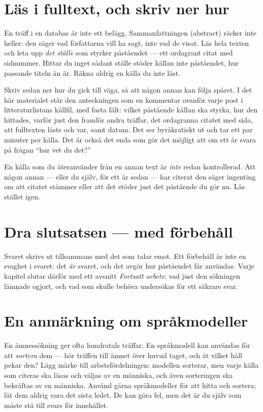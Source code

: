 \section{Läs i fulltext, och skriv ner hur}

En träff i en databas är inte ett belägg.  Sammanfattningen
(\foreignlanguage{english}{abstract}) räcker inte heller: den säger vad
författarna vill ha sagt, inte vad de visat.  Läs hela texten och leta
upp \emph{det ställe} som styrker påståendet --- ett ordagrant citat med
sidnummer.  Hittar du inget sådant ställe stöder källan inte påståendet,
hur passande titeln än är.  Räkna aldrig en källa du inte läst.

Skriv sedan ner hur du gick till väga, så att någon annan kan följa
spåret.  I det här materialet står den anteckningen som en kommentar
ovanför varje post i litteraturlistans källfil, med fasta fält: vilket
påstående källan ska styrka, hur den hittades, varför just den framför
andra träffar, det ordagranna citatet med sida, att fulltexten lästs och
var, samt datum.  Det ser byråkratiskt ut och tar ett par minuter per
källa.  Det är också det enda som gör det möjligt att om ett år svara på
frågan \enquote{hur vet du det?}

En källa som du återanvänder från en annan text är \emph{inte} redan
kontrollerad.  Att någon annan --- eller du själv, för ett år sedan ---
har citerat den säger ingenting om att citatet stämmer eller att det
stöder just det påstående du gör nu.  Läs stället igen.

\section{Dra slutsatsen --- med förbehåll}

Svaret skrivs ut tillsammans med det som talar emot.  Ett förbehåll är
inte en svaghet i svaret: det \emph{är} svaret, och det avgör hur
påståendet får användas.  Varje kapitel slutar därför med ett avsnitt
\emph{Fortsatt arbete}: vad just den sökningen lämnade ogjort, och vad
som skulle behöva undersökas för ett säkrare svar.

\section{En anmärkning om språkmodeller}

En ämnessökning ger ofta hundratals träffar.  En språkmodell kan
användas för att \emph{sortera} dem --- hör träffen till ämnet över
huvud taget, och åt vilket håll pekar den?  Lägg märke till
arbetsfördelningen: modellen sorterar, men varje källa som citeras ska
läsas och väljas av en människa, och även sorteringen ska bekräftas av
en människa.  Använd gärna språkmodeller för att hitta och sortera; låt
dem aldrig vara det sista ledet.  De kan göra fel, men det är du själv
som måste stå till svars för innehållet.

